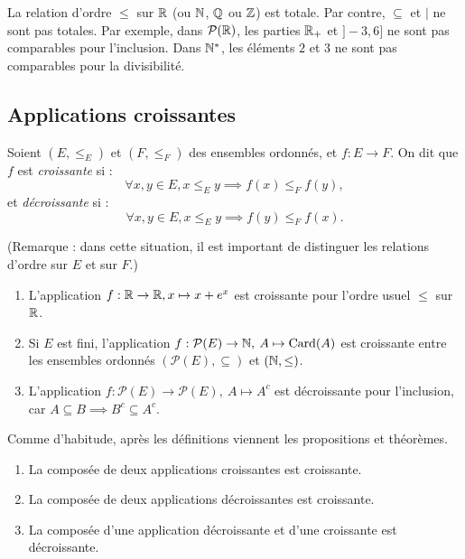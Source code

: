 \begin{exemples}
La relation d'ordre $\leq$ sur $\mathbb{R}$ (ou $\mathbb{N}$, $\mathbb{Q}$ ou  $\mathbb{Z}$) est totale. Par contre, $\subseteq$ et $|$ ne sont pas totales. Par exemple, dans $\mathcal P(\mathbb{R})$, les parties $\mathbb{R}_+$ et $]-3,6]$ ne sont pas comparables pour l'inclusion. Dans $\mathbb{N}^*$, les éléments $2$ et $3$ ne sont pas comparables pour la divisibilité.
\end{exemples}

\subsection{Applications croissantes}


\begin{definition}
Soient $(E,\leq_E)$ et $(F,\leq_F)$ des ensembles ordonnés, et $f : E\to F$. On dit que $f$ est \emph{croissante} si :
\[ \forall x, y\in E, x\leq_E y \implies f(x) \leq_F f(y),\]
et \emph{décroissante} si :
\[\forall x, y\in E, x\leq_E y \implies f(y) \leq_F f(x).\]
\end{definition}

(Remarque : dans cette situation, il est important de distinguer les relations d'ordre sur $E$ et sur $F$.)

\begin{exemple}
\begin{enumerate}
\item L'application $f : \mathbb{R}\to \mathbb{R}, x\mapsto x+e^x$ est croissante pour l'ordre usuel $\leq $ sur $\mathbb{R}$.
\item Si $E$ est fini, l'application $f : \mathcal P(E) \to \mathbb{N}, \: A\mapsto \operatorname{Card}(A)$ est croissante entre les ensembles ordonnés $(\mathcal P(E), \subseteq)$ et $(\mathbb{N}, \leq)$.
\item L'application $f : \mathcal P(E) \to \mathcal P(E), \: A\mapsto A^c$ est décroissante pour l'inclusion, car $A\subseteq B \implies B^c\subseteq A^c$.
\end{enumerate}
\end{exemple}

Comme d'habitude, après les définitions viennent les propositions et théorèmes.

\begin{proposition}
\begin{enumerate}
\item La composée de deux applications croissantes est croissante.
\item La composée de deux applications décroissantes est croissante.
\item La composée d'une application décroissante et d'une croissante est décroissante.
\end{enumerate}
\end{proposition}

